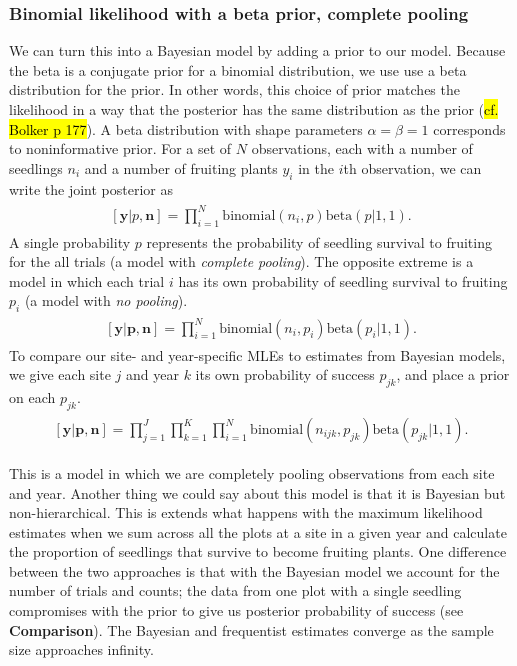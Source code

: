 \documentclass[12pt, oneside, titlepage]{article}   	%
\begin{document}
\subsubsection*{Binomial likelihood with a beta prior, complete pooling}

We can turn this into a Bayesian model by adding a prior to our model. Because the beta is a conjugate prior for a binomial distribution, we use use a beta distribution for the prior. In other words, this choice of prior matches the likelihood in a way that the posterior has the same distribution as the prior (\hl{cf. Bolker p 177}). A beta distribution with shape parameters $\alpha=\beta=1$ corresponds to noninformative prior. For a set of $N$ observations, each with a number of seedlings $n_i$ and a number of fruiting plants $y_i$ in the $i$th observation, we can write the joint posterior as
%
\begin{align}
  \begin{split}
[\bm{y}|p,\bm{n}]  = \prod_{i=1}^N \mathrm{binomial}(n_i,p) \mathrm{beta} (  p | 1 , 1 ).
  \end{split}
\end{align}
%
A single probability $p$ represents the probability of seedling survival to fruiting for the all trials (a model with \textit{complete pooling}). The opposite extreme is a model in which each trial $i$ has its own probability of seedling survival to fruiting $p_i$ (a model with \textit{no pooling}). 
%
\begin{align}
  \begin{split}
[\bm{y}|\bm{p},\bm{n}]  = \prod_{i=1}^N \mathrm{binomial}(n_i,p_i) \mathrm{beta} (  p_i | 1 , 1 ).
  \end{split}
\end{align}
%
To compare our site- and year-specific MLEs to estimates from Bayesian models, we give each site $j$ and year $k$ its own probability of success $p_{jk}$, and place a prior on each $p_{jk}$.
%
\begin{align}
  \begin{split}
[\bm{y}|\bm{p},\bm{n}]  = \prod_{j=1}^J\prod_{k=1}^K\prod_{i=1}^N \mathrm{binomial}(n_{ijk},p_{jk}) \mathrm{beta} (  p_{jk} | 1 , 1 ). \label{eq:bayesianNH}
  \end{split}
\end{align}
%

This is a model in which we are completely pooling observations from each site and year.  Another thing we could say about this model is that it is Bayesian but non-hierarchical. This is extends what happens with the maximum likelihood estimates when we sum across all the plots at a site in a given year and calculate the proportion of seedlings that survive to become fruiting plants. One difference between the two approaches is that with the Bayesian model we account for the number of trials and counts; the data from one plot with a single seedling compromises with the prior to give us posterior probability of success (see \textbf{Comparison}). The Bayesian and frequentist estimates converge as the sample size approaches infinity. 
\end{document}

